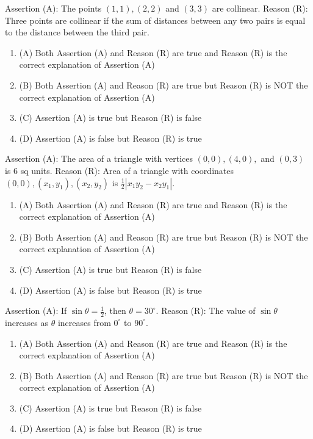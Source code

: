 \documentclass[12pt,a4paper]{exam}
\begin{document}
\begin{questions}
\question[1] Assertion (A): The points $(1, 1), (2, 2)$ and $(3, 3)$ are collinear. Reason (R): Three points are collinear if the sum of distances between any two pairs is equal to the distance between the third pair.
\begin{enumerate}[label=(\Alph*)]
  \item (A) Both Assertion (A) and Reason (R) are true and Reason (R) is the correct explanation of Assertion (A)
  \item (B) Both Assertion (A) and Reason (R) are true but Reason (R) is NOT the correct explanation of Assertion (A)
  \item (C) Assertion (A) is true but Reason (R) is false
  \item (D) Assertion (A) is false but Reason (R) is true
\end{enumerate}
\vspace{0.15cm}

\question[1] Assertion (A): The area of a triangle with vertices $(0, 0), (4, 0),$ and $(0, 3)$ is $6$ sq units. Reason (R): Area of a triangle with coordinates $(0, 0), (x_1, y_1), (x_2, y_2)$ is $\frac{1}{2}|x_1y_2 - x_2y_1|$.
\begin{enumerate}[label=(\Alph*)]
  \item (A) Both Assertion (A) and Reason (R) are true and Reason (R) is the correct explanation of Assertion (A)
  \item (B) Both Assertion (A) and Reason (R) are true but Reason (R) is NOT the correct explanation of Assertion (A)
  \item (C) Assertion (A) is true but Reason (R) is false
  \item (D) Assertion (A) is false but Reason (R) is true
\end{enumerate}
\vspace{0.15cm}

\question[1] Assertion (A): If $\sin \theta = \frac{1}{2}$, then $\theta = 30^\circ$. Reason (R): The value of $\sin \theta$ increases as $\theta$ increases from $0^\circ$ to $90^\circ$.
\begin{enumerate}[label=(\Alph*)]
  \item (A) Both Assertion (A) and Reason (R) are true and Reason (R) is the correct explanation of Assertion (A)
  \item (B) Both Assertion (A) and Reason (R) are true but Reason (R) is NOT the correct explanation of Assertion (A)
  \item (C) Assertion (A) is true but Reason (R) is false
  \item (D) Assertion (A) is false but Reason (R) is true
\end{enumerate}
\vspace{0.15cm}


\end{questions}
\end{document}
